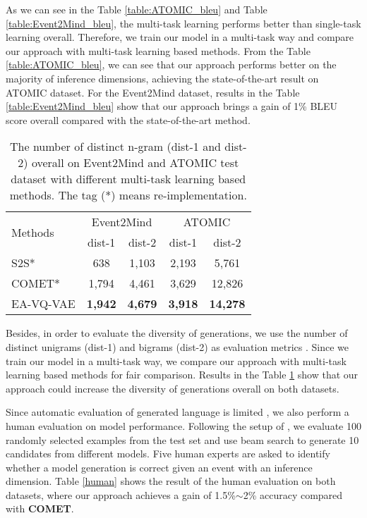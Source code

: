 \documentclass[11pt,a4paper]{article}
\begin{document}
As we can see in the Table \ref{table:ATOMIC_bleu} and Table \ref{table:Event2Mind_bleu}, the multi-task learning performs better than single-task learning overall. Therefore, we train our model in a multi-task way and compare our approach with multi-task learning based methods. 
From the Table \ref{table:ATOMIC_bleu}, we can see that our approach \mbox{performs} better on the majority of inference dimensions, achieving the state-of-the-art result on ATOMIC dataset. For the Event2Mind dataset, results in the Table \ref{table:Event2Mind_bleu} show that our approach brings a gain of 1\% BLEU score overall compared with the state-of-the-art method.




 \begin{table}[h]\small
	\centering
	\begin{tabular}{l|c|c|c|c}
		\hline
		\multirow{2}{*}{Methods}& \multicolumn{2}{c|}{Event2Mind} & \multicolumn{2}{c}{ATOMIC} \\
		\cline{2-5}
		& dist-1 & dist-2 & dist-1 & dist-2 \\
		\hline
S2S* & 638 &  1,103  & 2,193&5,761 \\
		COMET* & 1,794 &  4,461  & 3,629 & 12,826 \\
		EA-VQ-VAE & \bf{1,942} &  \bf{4,679}  & \bf{3,918} & \bf{14,278} \\ 
		\hline
	\end{tabular}
	\caption{The number of distinct n-gram (dist-1 and dist-2) overall on Event2Mind and ATOMIC test dataset with different multi-task learning based methods. The tag (*) means re-implementation.}
	\label{table:diversity} 
	\vspace{-0.2cm}
\end{table}

Besides, in order to evaluate the diversity of generations, we use the number of distinct unigrams (dist-1) and bigrams (dist-2) as evaluation \mbox{metrics} \cite{li2015diversity}. Since we train our model in a multi-task way, we compare our approach with multi-task learning based methods for fair comparison. Results in the Table \ref{table:diversity} show that our approach could increase the diversity of generations overall on both datasets.


Since automatic evaluation of generated language is limited \cite{liu-etal-2016-evaluate}, we also perform a human evaluation on model performance. Following the setup of \cite{sap2019atomic}, we evaluate 100 randomly selected examples from the test set and use beam search to generate 10 candidates from different models. Five human experts are asked to identify whether a model generation is correct given an event with an inference dimension. Table \ref{human} shows the result of the human evaluation on both datasets, where our approach achieves a gain of 1.5\%$\sim$2\% accuracy compared with {\bf COMET}.
\end{document}
